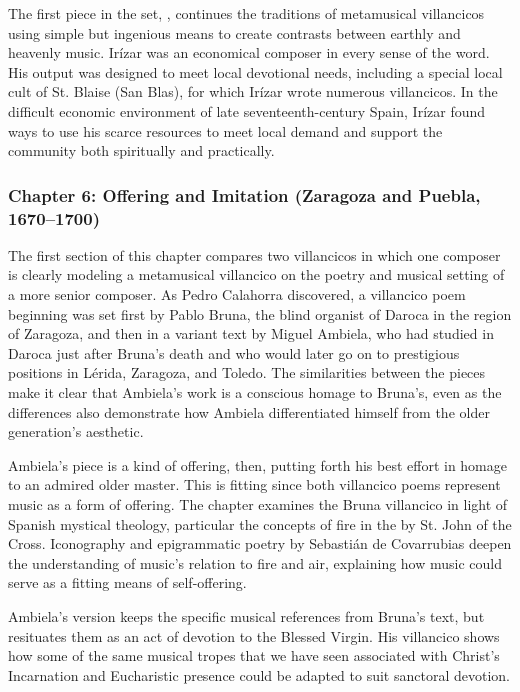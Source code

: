 \documentclass{vcbook-proposal}
\begin{document}
The first piece in the set, , continues the 
traditions of metamusical villancicos using simple but ingenious means to 
create contrasts between earthly and heavenly music.
Irízar was an economical composer in every sense of the word.
His output was designed to meet local devotional needs, including a special 
local cult of St. Blaise (San Blas), for which Irízar wrote numerous 
villancicos. 
In the difficult economic environment of late seventeenth-century Spain, Irízar 
found ways to use his scarce resources to meet local demand and support the 
community both spiritually and practically.

\subsubsection{Chapter 6: Offering and Imitation (Zaragoza and Puebla,
1670--1700)}


The first section of this chapter compares two villancicos in which one composer
is clearly modeling a metamusical villancico on the poetry and musical setting
of a more senior composer.
As Pedro Calahorra discovered, a villancico poem beginning  was set first by Pablo Bruna, the blind organist of Daroca in 
the region of Zaragoza, and then in a variant text by Miguel Ambiela, who had 
studied in Daroca just after Bruna's death and who would later go on to 
prestigious positions in Lérida, Zaragoza, and Toledo.%
  \Autocite{Calahorra:Suban}
The similarities between the pieces make it clear that Ambiela's work is a 
conscious homage to Bruna's, even as the differences also demonstrate how 
Ambiela differentiated himself from the older generation's aesthetic. 

Ambiela's piece is a kind of offering, then, putting forth his best effort in 
homage to an admired older master.
This is fitting since both villancico poems represent music as a form of 
offering.
The chapter examines the Bruna villancico in light of Spanish mystical 
theology, particular the concepts of fire in the  by St. John of the Cross.
Iconography and epigrammatic poetry by Sebastián de Covarrubias deepen the
understanding of music's relation to fire and air, explaining how music could
serve as a fitting means of self-offering.

Ambiela's version keeps the specific musical references from Bruna's text, but 
resituates them as an act of devotion to the Blessed Virgin.
His villancico shows how some of the same musical tropes that we have seen 
associated with Christ's Incarnation and Eucharistic presence could be adapted 
to suit sanctoral devotion. 
\end{document}
